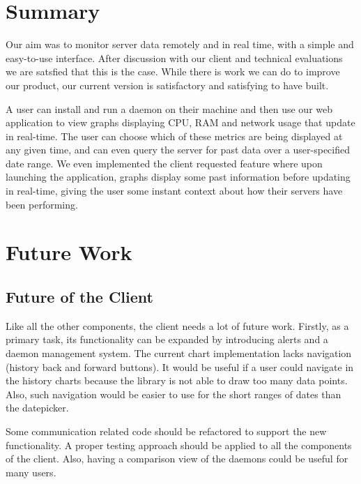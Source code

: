 \documentclass{l3proj}
\begin{document}
\section{Summary}

Our aim was to monitor server data remotely and in real time, with a simple and easy-to-use interface. After discussion with our client and technical evaluations we are satsfied that this is the case. While there is work we can do to improve our product, our current version is satisfactory and satisfying to have built.

A user can install and run a daemon on their machine and then use our web application to view graphs displaying CPU, RAM and network usage that update in real-time. The user can choose which of these metrics are being displayed at any given time, and can even query the server for past data over a user-specified date range. We even implemented the client requested feature where upon launching the application, graphs display some past information before updating in real-time, giving the user some instant context about how their servers have been performing.


\section{Future Work}

\subsection{Future of the Client}

Like all the other components, the client needs a lot of future work. Firstly, as a primary task, its functionality can be expanded by introducing alerts and a daemon management system. The current chart implementation lacks navigation (history back and forward buttons). It would be useful if a user could navigate in the history charts because the library is not able to draw too many data points. Also, such navigation would be easier to use for the short ranges of dates than the datepicker.

Some communication related code should be refactored to support the new functionality. A proper testing approach should be applied to all the components of the client. Also, having a comparison view of the daemons could be useful for many users.
\end{document}
